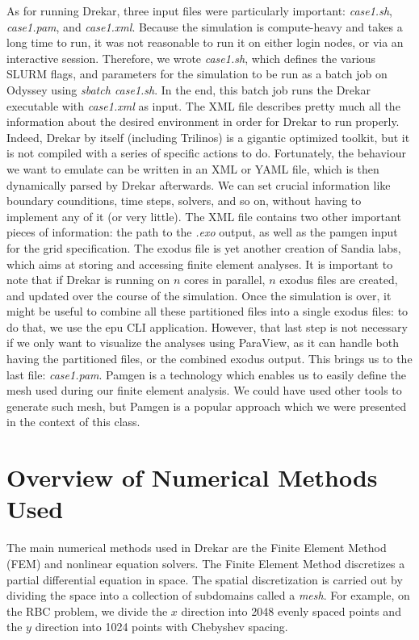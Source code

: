 \documentclass[11pt]{article} %
\begin{document}
As for running Drekar, three input files were particularly important: \textit{case1.sh}, \textit{case1.pam}, and \textit{case1.xml}. 
Because the simulation is compute-heavy and takes a long time to run, it was not reasonable to run it on 
either login nodes, or via an interactive session. 
Therefore, we wrote \textit{case1.sh}, which defines the various SLURM flags, and parameters for the simulation
to be run as a batch job on Odyssey using \textit{sbatch case1.sh}. 
In the end, this batch job runs the Drekar executable with \textit{case1.xml} as input. 
The XML file describes pretty much all the information about the desired environment in order for Drekar to run properly. 
Indeed, Drekar by itself (including Trilinos) is a gigantic optimized toolkit, but it is not compiled with a series of specific actions to do. 
Fortunately, the behaviour we want to emulate can be written in an XML or YAML file, which is then dynamically parsed by Drekar afterwards. 
We can set crucial information like boundary counditions, time steps, solvers, and so on, without having to implement any of it (or very little). 
The XML file contains two other important pieces of information: the path to the \textit{.exo} output, 
as well as the pamgen input for the grid specification. 
The exodus file is yet another creation of Sandia labs, which aims at storing and accessing finite element analyses.\cite{exo} 
It is important to note that if Drekar is running on $n$ cores in parallel, $n$ exodus files are created, 
and updated over the course of the simulation. 
Once the simulation is over, it might be useful to combine all these partitioned files into a single exodus files: 
to do that, we use the epu CLI application. However, that last step is not necessary if we only want to visualize
 the analyses using ParaView, as it can handle both having the partitioned files, or the combined exodus output.  
This brings us to the last file: \textit{case1.pam}.  
Pamgen is a technology which enables us to easily define the mesh used during our finite element analysis.\cite{pam} 
We could have used other tools to generate such mesh, but Pamgen is a popular approach which we were presented in the context of this class.


\section{Overview of Numerical Methods Used}
The main numerical methods used in Drekar are the Finite Element Method (FEM)
and nonlinear equation solvers.
The Finite Element Method discretizes a partial differential equation in space.
The spatial discretization is carried out by dividing the space into a collection of
subdomains called a \textit{mesh}.  
For example, on the RBC problem, we divide the $x$ direction into 2048 evenly spaced
points and the $y$ direction into 1024 points with Chebyshev spacing.
\end{document}
